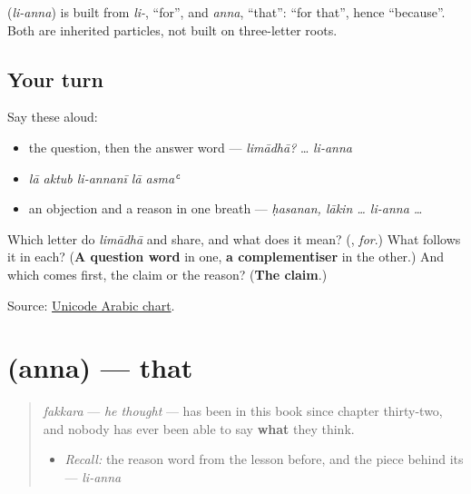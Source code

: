 \begin{cousinweb}
\textbf{} (\emph{li-anna}) is built from \emph{li-}, \textquotedblleft{}for\textquotedblright{}, and \emph{anna}, \textquotedblleft{}that\textquotedblright{}: \textquotedblleft{}for that\textquotedblright{}, hence \textquotedblleft{}because\textquotedblright{}. Both are inherited particles, not built on three-letter roots.
\end{cousinweb}

\subsection*{Your turn}
Say these aloud:

\begin{itemize}
\raggedright
  \item the question, then the answer word — \emph{limādhā?} … \emph{li-anna}
  \item \emph{lā aktub li-annanī lā asmaʿ}
  \item an objection and a reason in one breath — \emph{ḥasanan, lākin … li-anna …}
\end{itemize}

\begin{tcolorbox}[breakable,colback=teal!4,colframe=teal!35!black,title={Before you move on}]
Which letter do \emph{limādhā} and \textbf{} share, and what does it mean? (\textbf{}, \emph{for}.) What follows it in each? (\textbf{A question word} in one, \textbf{a complementiser} in the other.) And which comes first, the claim or the reason? (\textbf{The claim}.)

Source: \href{https://www.unicode.org/charts/PDF/U0600.pdf}{Unicode Arabic chart}.
\end{tcolorbox}
\section[\texorpdfstring{\ar{أنّ} (anna)}{أنّ (anna)}]{ (anna) — that}

\label{lesson:AR-C40-anna}



\begin{quote}
\emph{fakkara} — \emph{he thought} — has been in this book since chapter thirty-two, and nobody has ever been able to say \textbf{what} they think.

\begin{itemize}
\raggedright
  \item \emph{Recall:} the reason word from the lesson before, and the piece behind its  — \emph{li-anna}
\end{itemize}
\end{quote}

